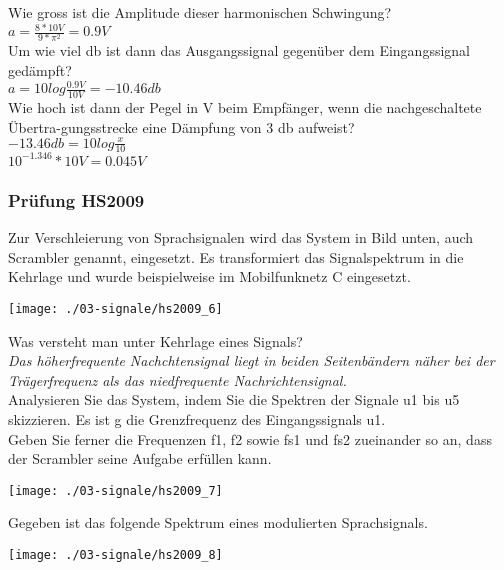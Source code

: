 Wie gross ist die Amplitude dieser harmonischen Schwingung?\\
$a=\frac{8*10V}{9*\pi^2}=0.9V$\\

Um wie viel db ist dann das Ausgangssignal gegenüber dem Eingangssignal gedämpft?\\
$a=10log\frac{0.9V}{10V}=-10.46db$\\

Wie hoch ist dann der Pegel in V beim Empfänger, wenn die nachgeschaltete Übertra-gungsstrecke eine Dämpfung von 3 db aufweist?\\
$-13.46db = 10log\frac{x}{10}$\\
$10^{-1.346}*10V = 0.045V$

\subsubsection{Prüfung HS2009}
Zur Verschleierung von Sprachsignalen wird das System in Bild unten, auch Scrambler genannt, eingesetzt. Es transformiert das Signalspektrum in die Kehrlage und wurde beispielweise im Mobilfunknetz C eingesetzt.\\
\begin{center}
    \vspace{-8pt}
    \texttt{[image: ./03-signale/hs2009\_6]}
    \vspace{-8pt}
\end{center}

Was versteht man unter Kehrlage eines Signals?\\
\textit{Das höherfrequente Nachchtensignal liegt in beiden Seitenbändern näher bei der Trägerfrequenz als das niedfrequente Nachrichtensignal.}\\

Analysieren Sie das System, indem Sie die Spektren der Signale u1 bis u5 skizzieren. Es ist g die Grenzfrequenz des Eingangssignals u1.\\
Geben Sie ferner die Frequenzen f1, f2 sowie fs1 und fs2 zueinander so an, dass der Scrambler seine Aufgabe erfüllen kann.
\begin{center}
    \vspace{-8pt}
    \texttt{[image: ./03-signale/hs2009\_7]}
    \vspace{-8pt}
\end{center}

Gegeben ist das folgende Spektrum eines modulierten Sprachsignals.
\begin{center}
    \vspace{-8pt}
    \texttt{[image: ./03-signale/hs2009\_8]}
    \vspace{-8pt}
\end{center}

